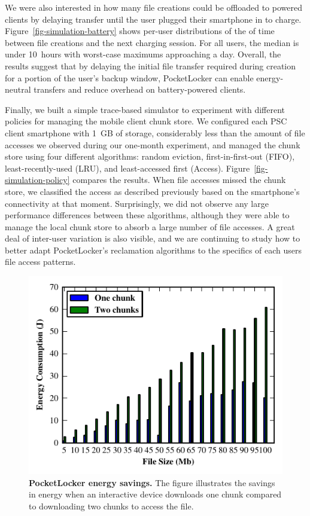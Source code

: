 We were also interested in how many file creations could be offloaded to
powered clients by delaying transfer until the user plugged their smartphone
in to charge. Figure~\ref{fig-simulation-battery} shows per-user
distributions of the of time between file creations and the next charging
session. For all users, the median is under 10~hours with worst-case maximums
approaching a day. Overall, the results suggest that by delaying the initial
file transfer required during creation for a portion of the user's backup
window, PocketLocker can enable energy-neutral transfers and reduce overhead
on battery-powered clients.


Finally, we built a simple trace-based simulator to experiment with different
policies for managing the mobile client chunk store. We configured each PSC
client smartphone with 1~GB of storage, considerably less than the amount of
file accesses we observed during our one-month experiment, and managed the
chunk store using four different algorithms: random eviction,
first-in-first-out (FIFO), least-recently-used (LRU), and least-accessed
first (Access). Figure~\ref{fig-simulation-policy} compares the results. When
file accesses missed the chunk store, we classified the access as described
previously based on the smartphone's connectivity at that moment.
Surprisingly, we did not observe any large performance differences between
these algorithms, although they were able to manage the local
chunk store to absorb a large number of file accesses. A great
deal of inter-user variation is also visible, and we are continuing to study
how to better adapt PocketLocker's reclamation algorithms to the specifics of
each users file access patterns.
\begin{figure}[t]
  
  \includegraphics[scale=.97]{./figures/energysavings.pdf}
  
  \caption{\small \textbf{PocketLocker energy savings.} The figure
    illustrates the savings in energy when an interactive device downloads
  one chunk compared to downloading two chunks to access the file.}
  
  \label{fig-evaluation-energysavings}

  \vspace*{-0.2in}
\end{figure}

